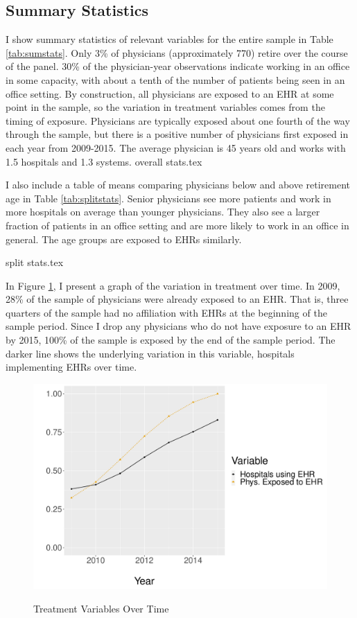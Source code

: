 \documentclass[12pt]{article}
\begin{document}
\subsection{Summary Statistics}

I show summary statistics of relevant variables for the entire sample in Table \ref{tab:sumstats}. Only 3\% of physicians (approximately 770) retire over the course of the panel. 30\% of the physician-year observations indicate working in an office in some capacity, with about a tenth of the number of patients being seen in an office setting. By construction, all physicians are exposed to an EHR at some point in the sample, so the variation in treatment variables comes from the timing of exposure. Physicians are typically exposed about one fourth of the way through the sample, but there is a positive number of physicians first exposed in each year from 2009-2015. The average physician is 45 years old and works with 1.5 hospitals and 1.3 systems. 
{overall stats.tex}


I also include a table of means comparing physicians below and above retirement age in Table \ref{tab:splitstats}. Senior physicians see more patients and work in more hospitals on average than younger physicians. They also see a larger fraction of patients in an office setting and are more likely to work in an office in general. The age groups are exposed to EHRs similarly.

{split stats.tex}


In Figure \ref{fig:treatmentgraph}, I present a graph of the variation in treatment over time. In 2009, 28\% of the sample of physicians were already exposed to an EHR. That is, three quarters of the sample had no affiliation with EHRs at the beginning of the sample period. Since I drop any physicians who do not have exposure to an EHR by 2015, 100\% of the sample is exposed by the end of the sample period. The darker line shows the underlying variation in this variable, hospitals implementing EHRs over time. 

\begin{figure}[t]
\centering
\captionsetup{width=.45\linewidth}
    \caption{Treatment Variables Over Time}
    \includegraphics[scale=.5]{Objects/sum_stats_year.pdf}
    \label{fig:treatmentgraph}
\end{figure}
\end{document}
